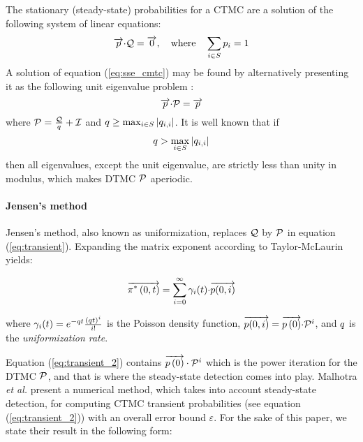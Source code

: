 \documentclass[times, 10pt,twocolumn]{article}
\begin{document}
		The stationary (steady-state) probabilities for a CTMC are a solution of the following system of linear equations:
		\begin{equation}
			\overrightarrow{p} {\cdot} \mathcal{Q} = \overrightarrow{0}, \quad \text{where} \quad \sum_{i \in S} p_{i} = 1
			\label{eq:sse_cmtc}
		\end{equation}
		A solution of equation (\ref{eq:sse_cmtc}) may be found by alternatively presenting it as the following unit eigenvalue problem \cite{Stewart_ACM78}:
		\begin{equation}
			\overrightarrow{p}{\cdot}\mathcal{P} = \overrightarrow{p}
			\nonumber
		\end{equation}
		where $\mathcal{P}=\frac{\mathcal{Q}}{q}+\mathcal{I}$ and $q \geq \max_{i \in S}| q_{i,i} |$.  It is well known \cite{Stewart_ACM78} that if
		\begin{equation}
			q > \max_{i \in S} |q_{i,i}|
			\nonumber
		\end{equation}
		then all eigenvalues, except the unit eigenvalue, are strictly less than unity in modulus, which makes DTMC $\mathcal{P}$ aperiodic.

	\paragraph{Jensen's method}
		 Jensen's method, also known as uniformization, replaces $\mathcal{Q}$ by $\mathcal{P}$ in equation (\ref{eq:transient}).  Expanding the matrix exponent according to Taylor-McLaurin yields:

		\begin{equation}
			\overrightarrow{\pi^{*} \left(0, t \right )} = \sum_{i=0}^{\infty}\gamma_{i}(t) {\cdot} \overrightarrow{p(0,i)}
			\label{eq:transient_2}
		\end{equation}

		where $\gamma_{i}(t) = e^{-q t}\frac{\left( q t \right)^{i}}{i!}$ is the Poisson density function, $\overrightarrow{p(0,i)} = \overrightarrow{p \left( 0 \right)} {\cdot} \mathcal{P}^{i}$, and $q$ is the \emph{uniformization rate}.

		Equation (\ref{eq:transient_2}) contains $\overrightarrow{p \left( 0 \right)} \cdot \mathcal{P}^{i}$ which is the power iteration for the DTMC $\mathcal{P}$, and that is where the steady-state detection comes into play.  Malhotra \emph{et al.} \cite{MalhotraMT_MR94} present a numerical method, which takes into account steady-state detection, for computing CTMC transient probabilities (see equation (\ref{eq:transient_2})) with an overall error bound $\varepsilon$.  For the sake of this paper, we state their result in the following form:
\end{document}

